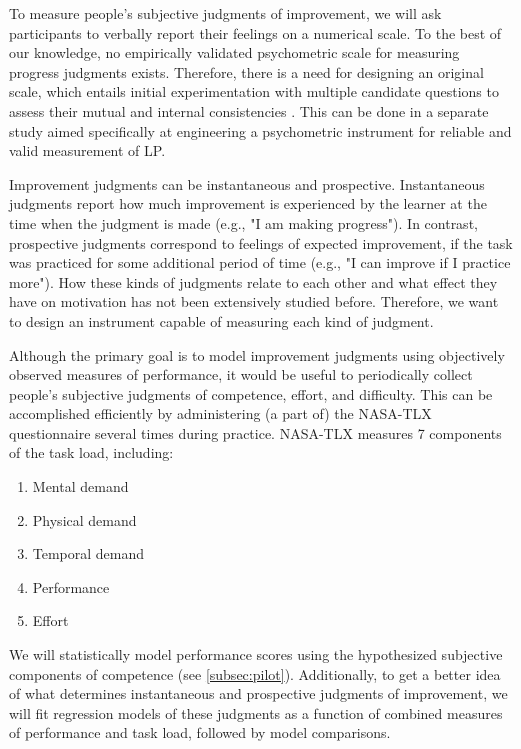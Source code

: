 To measure people's subjective judgments of improvement, we will ask participants to verbally report their feelings on a numerical scale. To the best of our knowledge, no empirically validated psychometric scale for measuring progress judgments exists. Therefore, there is a need for designing an original scale, which entails initial experimentation with multiple candidate questions to assess their mutual and internal consistencies \parencite{kline_psychological_2005,mcneish_thanks_2018}. This can be done in a separate study aimed specifically at engineering a psychometric instrument for reliable and valid measurement of \ac{LP}.

Improvement judgments can be instantaneous and prospective. Instantaneous judgments report how much improvement is experienced by the learner at the time when the judgment is made (e.g., "I am making progress"). In contrast, prospective judgments correspond to feelings of expected improvement, if the task was practiced for some additional period of time (e.g., "I can improve if I practice more"). How these kinds of judgments relate to each other and what effect they have on motivation has not been extensively studied before. Therefore, we want to design an instrument capable of measuring each kind of judgment.

Although the primary goal is to model improvement judgments using objectively observed measures of performance, it would be useful to periodically collect people's subjective judgments of competence, effort, and difficulty. This can be accomplished efficiently by administering (a part of) the NASA-TLX questionnaire \cite{hart_development_1988} several times during practice. NASA-TLX measures 7 components of the task load, including: 
\begin{enumerate}
  \item Mental demand
  \item Physical demand
  \item Temporal demand
  \item Performance
  \item Effort
\end{enumerate}
We will statistically model performance scores using the hypothesized subjective components of competence (see \autoref{subsec:pilot}). Additionally, to get a better idea of what determines instantaneous and prospective judgments of improvement, we will fit regression models of these judgments as a function of combined measures of performance and task load, followed by model comparisons. 

